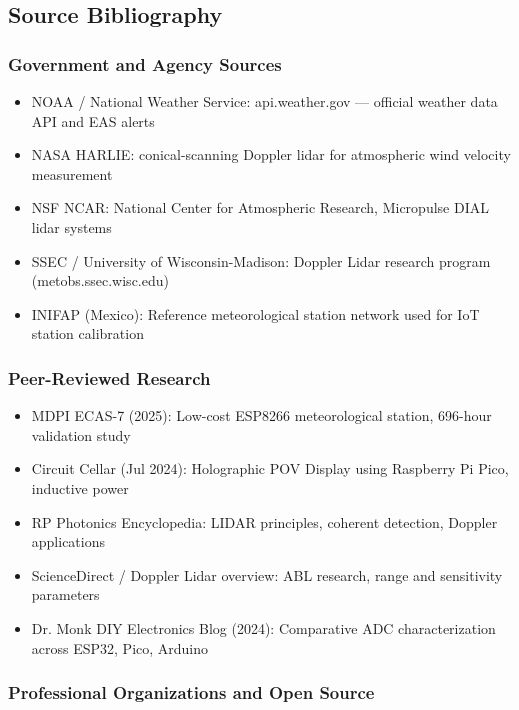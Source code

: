 \documentclass[11pt,letterpaper]{article}
\begin{document}
\subsection{Source Bibliography}

\subsubsection{Government and Agency Sources}

\begin{itemize}[leftmargin=1.5em]
  \item NOAA / National Weather Service: api.weather.gov --- official weather data API and EAS alerts
  \item NASA HARLIE: conical-scanning Doppler lidar for atmospheric wind velocity measurement
  \item NSF NCAR: National Center for Atmospheric Research, Micropulse DIAL lidar systems
  \item SSEC / University of Wisconsin-Madison: Doppler Lidar research program (metobs.ssec.wisc.edu)
  \item INIFAP (Mexico): Reference meteorological station network used for IoT station calibration
\end{itemize}

\subsubsection{Peer-Reviewed Research}

\begin{itemize}[leftmargin=1.5em]
  \item MDPI ECAS-7 (2025): Low-cost ESP8266 meteorological station, 696-hour validation study
  \item Circuit Cellar (Jul 2024): Holographic POV Display using Raspberry Pi Pico, inductive power
  \item RP Photonics Encyclopedia: LIDAR principles, coherent detection, Doppler applications
  \item ScienceDirect / Doppler Lidar overview: ABL research, range and sensitivity parameters
  \item Dr. Monk DIY Electronics Blog (2024): Comparative ADC characterization across ESP32, Pico, Arduino
\end{itemize}

\subsubsection{Professional Organizations and Open Source}
\end{document}
